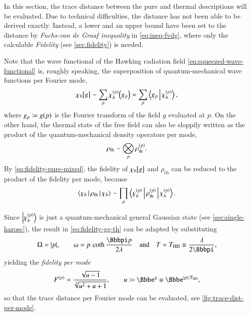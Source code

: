 In this section, the trace distance between the pure and thermal descriptions 
will be evaluated. Due to technical difficulties, the distance has not been able 
to be derived exactly. Instead, a lower and an upper bound have been set to the 
distance by \emph{Fuchs-van de Graaf inequality} in \cref{eq:ineq-fvdg}, where 
only the calculable \emph{Fidelity} (see \cref{sec:fidelity}) is needed.

Note that the wave functional of the Hawking radiation field 
\cref{eq:squeezed-wave-functional} is, roughly speaking, the superposition of 
quantum-mechanical wave functions per Fourier mode,
\begin{equation}
{\chi_b}\mathopen{}\left[g\right]\mathclose{} \sim \sum_p {\chi_b^{\left(p\right)}}\mathopen{}\left(g_p\right)\mathclose{}
= \sum_p \Braket{g_p | \chi_b^{\left(p\right)}},
\label{eq:wave-function-decomposed}
\end{equation}
where $g_p \coloneqq {g}\mathopen{}\left(p\right)\mathclose{}$ is the Fourier transform of the field $g$ 
evaluated at $p$. On the other hand, the thermal state of the free field can 
also be sloppily written as the product of the quantum-mechanical density 
operators per mode,
\begin{equation}
{\rho}_\text{th} \sim \bigotimes_p {\rho}_\text{th}^{\left(p\right)}.
\end{equation}
By \cref{eq:fidelity-pure-mixed}, the fidelity of ${\chi_b}\mathopen{}\left[g\right]\mathclose{}$ and 
$\rho_\text{th}$ can be reduced to the product of the fidelity per mode, because
\begin{equation}
\Braket{\chi_b | {\rho}_\text{th} | \chi_b} \sim \prod_p 
\Braket{\chi_b^{\left(p\right)} | {\rho}_\text{th}^{\left(p\right)} | \chi_b^{\left(p\right)}}.
\label{eq:expectation-decomposed}
\end{equation}

Since $\Ket{\chi_b^{\left(p\right)}}$ is just a quantum-mechanical general Gaussian 
state (see \cref{sec:single-harosc}), the result in \cref{eq:fidelity-gg-th} 
can be adapted by substituting
\begin{equation}
\Omega = \vbr{p},\qquad \omega = p\,\coth\frac{\pp p}{2\lambda}\quad
\text{and}\quad T = T_\text{HD} \equiv \frac{\lambda}{2\pp},
\end{equation}
yielding the \emph{fidelity per mode}
\begin{equation}
F^\rbr{p} = \frac{\sqrt{u-1}}{\sqrt[4]{u^2+u+1}},\qquad
u \coloneqq \ee^q \equiv \ee^{\vbr{p}/T_\text{HD}},
\label{eq:fidelity-pt}
\end{equation}
so that the trace distance per Fourier mode can be evaluated, see 
\cref{fig:trace-dist-per-mode}.

